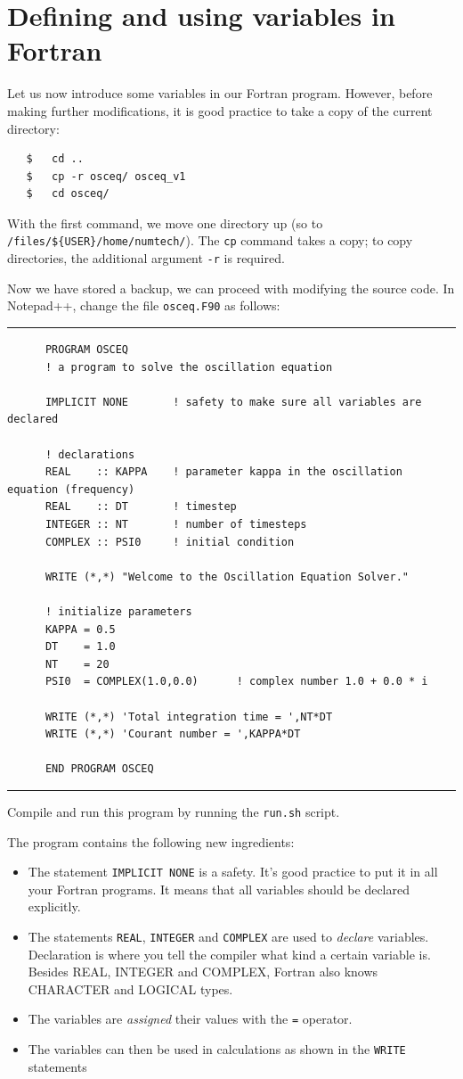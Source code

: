 \documentclass[a4paper]{article}
\begin{document}
\section{Defining and using variables in Fortran}
%
\par
Let us now introduce some variables in our Fortran program. However, before making further modifications, it is good practice to take a copy of the current directory:
%
\begin{verbatim}
   $   cd ..
   $   cp -r osceq/ osceq_v1
   $   cd osceq/
\end{verbatim}
%
With the first command, we move one directory up (so to \verb+/files/${USER}/home/numtech/+). The \verb+cp+ command takes a copy; to copy directories, the additional argument \verb+-r+ is required.
%
\par
Now we have stored a backup, we can proceed with modifying the source code. In {Notepad++}, change the file \texttt{osceq.F90} as follows:
%
{\vspace{10pt}\hrule\small\vspace*{-2pt}\begin{verbatim}
	  PROGRAM OSCEQ
	  ! a program to solve the oscillation equation
	  
	  IMPLICIT NONE       ! safety to make sure all variables are declared
	  
	  ! declarations
	  REAL    :: KAPPA    ! parameter kappa in the oscillation equation (frequency)
	  REAL    :: DT       ! timestep
	  INTEGER :: NT       ! number of timesteps
	  COMPLEX :: PSI0     ! initial condition

	  WRITE (*,*) "Welcome to the Oscillation Equation Solver."
	  
	  ! initialize parameters
	  KAPPA = 0.5
	  DT    = 1.0
	  NT    = 20
	  PSI0  = COMPLEX(1.0,0.0)      ! complex number 1.0 + 0.0 * i
	  
	  WRITE (*,*) 'Total integration time = ',NT*DT
	  WRITE (*,*) 'Courant number = ',KAPPA*DT
	  
	  END PROGRAM OSCEQ
\end{verbatim}\hrule\vspace{5pt}}
%
Compile and run this program by running the \verb+run.sh+ script.
%
\par
The program contains the following new ingredients:
%
\begin{itemize}
	\item The statement \verb+IMPLICIT NONE+ is a safety. It's good practice to put it in all your Fortran programs. It means that all variables should be declared explicitly.
	\item The statements \verb+REAL+, \verb+INTEGER+ and \verb+COMPLEX+ are used to \emph{declare} variables. Declaration is where you tell the compiler what kind a certain variable is. Besides REAL, INTEGER and COMPLEX, Fortran also knows CHARACTER and LOGICAL types.
	\item The variables are \emph{assigned} their values with the \verb+=+ operator.
	\item The variables can then be used in calculations as shown in the \verb+WRITE+ statements
\end{itemize}
\end{document}
